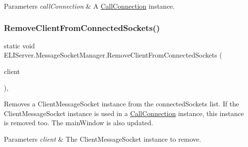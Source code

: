 \begin{DoxyParams}{Parameters}
{\em call\+Connection} & A \hyperlink{class_e_l_i_server_1_1_call_connection}{Call\+Connection} instance.\\
\hline
\end{DoxyParams}
\mbox{\label{class_e_l_i_server_1_1_message_socket_manager_a921b68b4622c90628ae7b179bccdb10c}} 
\subsubsection{\texorpdfstring{Remove\+Client\+From\+Connected\+Sockets()}{RemoveClientFromConnectedSockets()}}
{\footnotesize\ttfamily static void E\+L\+I\+Server.\+Message\+Socket\+Manager.\+Remove\+Client\+From\+Connected\+Sockets (\begin{DoxyParamCaption}\item[{\hyperlink{class_e_l_i_server_1_1_messaging_1_1_client_message_socket}{Client\+Message\+Socket}}]{client }\end{DoxyParamCaption})\hspace{0.3cm}{\ttfamily [inline]}, {\ttfamily [static]}}



Removes a Client\+Message\+Socket instance from the connected\+Sockets list. If the Client\+Message\+Socket instance is used in a \hyperlink{class_e_l_i_server_1_1_call_connection}{Call\+Connection} instance, this instance is removed too. The main\+Window is also updated. 


\begin{DoxyParams}{Parameters}
{\em client} & The Client\+Message\+Socket instance to remove.\\
\hline
\end{DoxyParams}
\mbox{\label{class_e_l_i_server_1_1_message_socket_manager_aa4716112d551ce249f56cca53764d19d}} 
